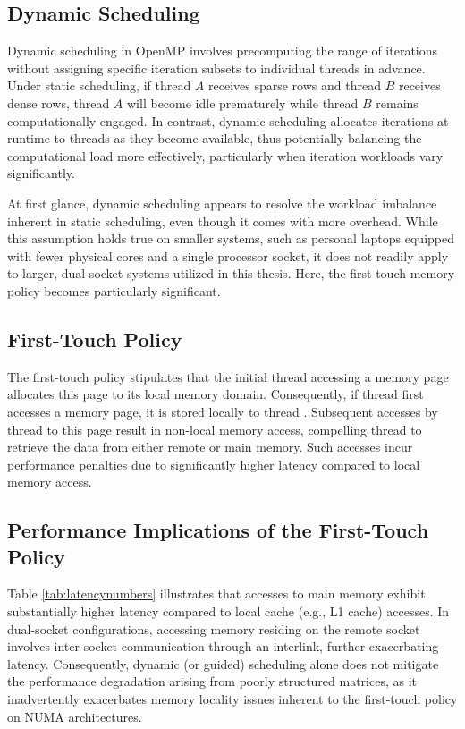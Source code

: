 \subsection{Dynamic Scheduling}

Dynamic scheduling in OpenMP involves precomputing the range of iterations without assigning specific iteration subsets to individual threads in advance. Under static scheduling, if thread \(A\) receives sparse rows and thread \(B\) receives dense rows, thread \(A\) will become idle prematurely while thread \(B\) remains computationally engaged. In contrast, dynamic scheduling allocates iterations at runtime to threads as they become available, thus potentially balancing the computational load more effectively, particularly when iteration workloads vary significantly.

At first glance, dynamic scheduling appears to resolve the workload imbalance inherent in static scheduling, even though it comes with more overhead. While this assumption holds true on smaller systems, such as personal laptops equipped with fewer physical cores and a single processor socket, it does not readily apply to larger, dual-socket systems utilized in this thesis. Here, the first-touch memory policy becomes particularly significant.

\subsection{First-Touch Policy}
The first-touch policy stipulates that the initial thread accessing a memory page allocates this page to its local memory domain. Consequently, if thread  first accesses a memory page, it is stored locally to thread . Subsequent accesses by thread  to this page result in non-local memory access, compelling thread  to retrieve the data from either remote or main memory. Such accesses incur performance penalties due to significantly higher latency compared to local memory access.

\subsection{Performance Implications of the First-Touch Policy}

Table \ref{tab:latencynumbers} illustrates that accesses to main memory exhibit substantially higher latency compared to local cache (e.g., L1 cache) accesses. In dual-socket configurations, accessing memory residing on the remote socket involves inter-socket communication through an interlink, further exacerbating latency. Consequently, dynamic (or guided) scheduling alone does not mitigate the performance degradation arising from poorly structured matrices, as it inadvertently exacerbates memory locality issues inherent to the first-touch policy on NUMA architectures.








